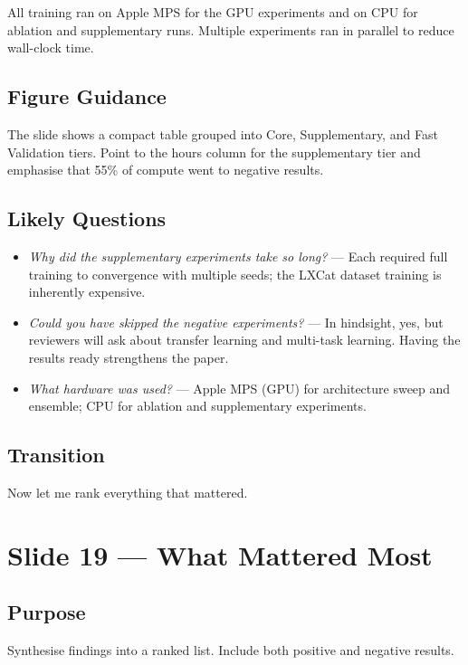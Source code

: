 \documentclass[12pt,a4paper]{article}
\begin{document}
All training ran on Apple MPS for the GPU experiments and on CPU for
ablation and supplementary runs.  Multiple experiments ran in
parallel to reduce wall-clock time.

\subsection*{Figure Guidance}
The slide shows a compact table grouped into Core, Supplementary,
and Fast Validation tiers.  Point to the hours column for the
supplementary tier and emphasise that 55\% of compute went to
negative results.

\subsection*{Likely Questions}
\begin{itemize}
  \item \emph{Why did the supplementary experiments take so long?}
    --- Each required full training to convergence with multiple
    seeds; the LXCat dataset training is inherently expensive.
  \item \emph{Could you have skipped the negative experiments?}
    --- In hindsight, yes, but reviewers will ask about transfer
    learning and multi-task learning.  Having the results ready
    strengthens the paper.
  \item \emph{What hardware was used?}
    --- Apple MPS (GPU) for architecture sweep and ensemble; CPU for
    ablation and supplementary experiments.
\end{itemize}

\subsection*{Transition}
Now let me rank everything that mattered.

\clearpage

\section{Slide 19 --- What Mattered Most}
\label{sec:slide19}

\subsection*{Purpose}
Synthesise findings into a ranked list. Include both positive and
negative results.
\end{document}
